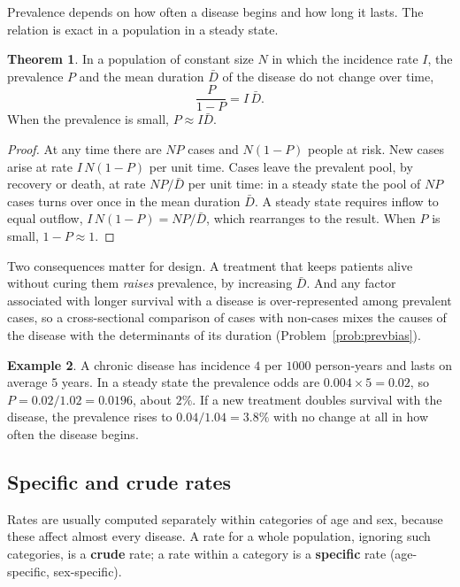 \documentclass[11pt,a4paper]{article}
\numberwithin{equation}{section}
\theoremstyle{definition}
\newtheorem{thm}{Theorem}[subsection]
\newtheorem{exa}[thm]{Example}
\begin{document}
Prevalence depends on how often a disease begins and how long it lasts. The relation is exact in a population in a steady state.

\begin{thm}
\label{thm:steady}
In a population of constant size $N$ in which the incidence rate $I$, the prevalence $P$ and the mean duration $\bar D$ of the disease do not
change over time,
\[
\frac{P}{1 - P} = I\,\bar D .
\]
When the prevalence is small, $P \approx I\bar D$.
\end{thm}

\begin{proof}
At any time there are $NP$ cases and $N(1 - P)$ people at risk. New cases arise at rate $I\,N(1 - P)$ per unit time. Cases leave the prevalent
pool, by recovery or death, at rate $NP/\bar D$ per unit time: in a steady state the pool of $NP$ cases turns over once in the mean duration
$\bar D$. A steady state requires inflow to equal outflow, $I\,N(1 - P) = NP/\bar D$, which rearranges to the result. When $P$ is small, $1 - P \approx 1$.
\end{proof}

Two consequences matter for design. A treatment that keeps patients alive without curing them \emph{raises} prevalence, by increasing
$\bar D$. And any factor associated with longer survival with a disease is over-represented among prevalent cases, so a cross-sectional
comparison of cases with non-cases mixes the causes of the disease with the determinants of its duration (Problem~\ref{prob:prevbias}).

\begin{exa}
A chronic disease has incidence $4$ per $1000$ person-years and lasts on average $5$ years. In a steady state the prevalence odds are
$0.004 \times 5 = 0.02$, so $P = 0.02/1.02 = 0.0196$, about $2\%$. If a new treatment doubles survival with the disease, the prevalence rises to
$0.04/1.04 = 3.8\%$ with no change at all in how often the disease begins.
\end{exa}

\subsection{Specific and crude rates}
\label{sec:crude}

Rates are usually computed separately within categories of age and sex, because these affect almost every disease. A rate for a whole
population, ignoring such categories, is a \textbf{crude} rate; a rate within a category is a \textbf{specific} rate (age-specific,
sex-specific).
\end{document}
